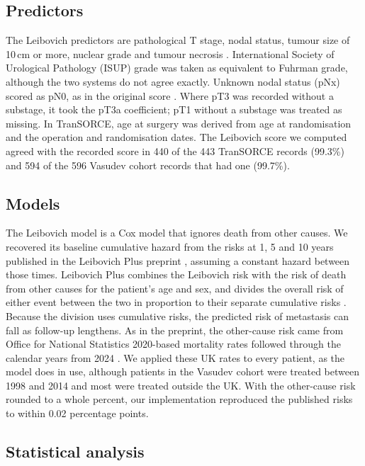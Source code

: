 \documentclass[11pt,a4paper]{article}
\begin{document}
\subsection*{Predictors}

The Leibovich predictors are pathological T stage, nodal status, tumour size of 10\,cm or more, nuclear grade and tumour necrosis \cite{Leibovich_2003}.
International Society of Urological Pathology (ISUP) grade was taken as equivalent to Fuhrman grade, although the two systems do not agree exactly.
Unknown nodal status (pNx) scored as pN0, as in the original score \cite{Leibovich_2003}.
Where pT3 was recorded without a substage, it took the pT3a coefficient; pT1 without a substage was treated as missing.
In TranSORCE, age at surgery was derived from age at randomisation and the operation and randomisation dates.
The Leibovich score we computed agreed with the recorded score in 440 of the 443 TranSORCE records (99.3\%) and 594 of the 596 Vasudev cohort records that had one (99.7\%).

\subsection*{Models}

The Leibovich model is a Cox model that ignores death from other causes.
We recovered its baseline cumulative hazard from the risks at 1, 5 and 10 years published in the Leibovich Plus preprint \cite{Stimpson_2025}, assuming a constant hazard between those times.
Leibovich Plus combines the Leibovich risk with the risk of death from other causes for the patient's age and sex, and divides the overall risk of either event between the two in proportion to their separate cumulative risks \cite{Stimpson_2025}.
Because the division uses cumulative risks, the predicted risk of metastasis can fall as follow-up lengthens.
As in the preprint, the other-cause risk came from Office for National Statistics 2020-based mortality rates followed through the calendar years from 2024 \cite{Stimpson_2025,ONS_qx}.
We applied these UK rates to every patient, as the model does in use, although patients in the Vasudev cohort were treated between 1998 and 2014 and most were treated outside the UK.
With the other-cause risk rounded to a whole percent, our implementation reproduced the published risks to within 0.02 percentage points.

\subsection*{Statistical analysis}
\end{document}
